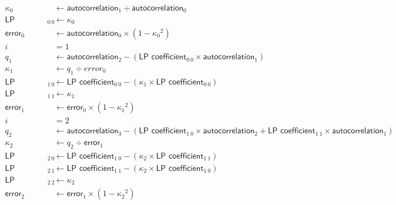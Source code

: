{
\begin{align*}
\kappa_0 &\leftarrow \textsf{autocorrelation}_1 \div \textsf{autocorrelation}_0 \\
\textsf{LP coefficient}_{0~0} &\leftarrow \kappa_0 \\
\textsf{error}_0 &\leftarrow \textsf{autocorrelation}_0 \times (1 - {\kappa_0} ^ 2) \\
i &= 1 \\
q_1 &\leftarrow \textsf{autocorrelation}_2 - (\textsf{LP coefficient}_{0~0} \times \textsf{autocorrelation}_{1}) \\
\kappa_1 &\leftarrow q_1 \div error_0 \\
\textsf{LP coefficient}_{1~0} &\leftarrow \textsf{LP coefficient}_{0~0} - (\kappa_1 \times \textsf{LP coefficient}_{0~0}) \\
\textsf{LP coefficient}_{1~1} &\leftarrow \kappa_1 \\
\textsf{error}_1 &\leftarrow \textsf{error}_0 \times (1 - {\kappa_1} ^ 2) \\
i &= 2 \\
q_2 &\leftarrow \textsf{autocorrelation}_3 - (\textsf{LP coefficient}_{1~0} \times \textsf{autocorrelation}_{2} + \textsf{LP coefficient}_{1~1} \times \textsf{autocorrelation}_{1}) \\
\kappa_2 &\leftarrow q_2 \div \textsf{error}_1 \\
\textsf{LP coefficient}_{2~0} &\leftarrow \textsf{LP coefficient}_{1~0} - (\kappa_2 \times \textsf{LP coefficient}_{1~1}) \\
\textsf{LP coefficient}_{2~1} &\leftarrow \textsf{LP coefficient}_{1~1} - (\kappa_2 \times \textsf{LP coefficient}_{1~0}) \\
\textsf{LP coefficient}_{2~2} &\leftarrow \kappa_2 \\
\textsf{error}_2 &\leftarrow \textsf{error}_1 \times (1 - {\kappa_2} ^ 2) \\
\end{align*}
}

\clearpage

